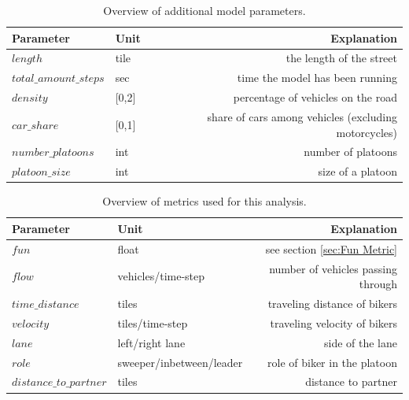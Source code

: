     \begin{table}
    \centering
    \begin{tabular}{@{}llr@{}} \toprule
        Parameter                   & Unit          & Explanation        \\ \midrule
        $length$                    & tile          & the length of the street \\
        $total\_amount\_steps$        & sec           & time the model has been running \\
        $density$                   & [0,2]         & percentage of vehicles on the road \\
        $car\_share$                 & [0,1]         & share of cars among vehicles (excluding motorcycles) \\
        $number\_platoons$           & int           & number of platoons \\
        $platoon\_size$              & int           & size of a platoon \\ \bottomrule
    \end{tabular}
    \caption{Overview of additional model parameters.} 
    \label{tab:moreparameters}
    \end{table}


    \begin{table}
    \centering
    \begin{tabular}{@{}llr@{}} \toprule
        Parameter                   & Unit                      & Explanation        \\ \midrule
        $fun$                       & float                     & see section \ref{sec:Fun Metric} \\
        $flow$                      & vehicles/time-step        & number of vehicles passing through \\
        $time\_distance$             & tiles                     & traveling distance of bikers\\
        $velocity$                  & tiles/time-step           & traveling velocity of bikers\\
        $lane$                      & left/right lane           & side of the lane \\
        $role$                      & sweeper/inbetween/leader  & role of biker in the platoon\\
        $distance\_to\_partner$       & tiles                     & distance to partner \\ \bottomrule
    \end{tabular}
    \caption{Overview of metrics used for this analysis.} 
    \label{tab:moremetrics}
    \end{table}


